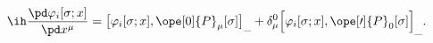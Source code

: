 \begin{equation*}
\ih\frac{\pd \varphi_i[\sigma;x]  }{\pd x^\mu}
=
\bigl[ \varphi_i[\sigma;x] , \ope[0]{P}_\mu [\sigma]
\bigr]_{\_}
+
\delta_\mu^0
\Bigl[ \varphi_i[\sigma;x] ,
	\ope[\prime]{P}_0[\sigma]
\Bigr]_{\_} .
	\end{equation*}

